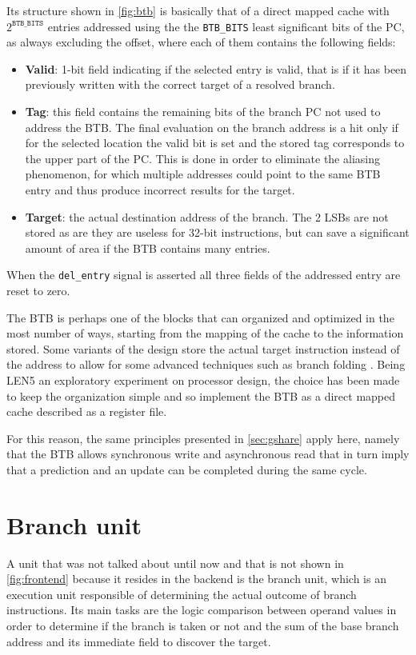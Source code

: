 Its structure shown in \cref{fig:btb} is basically that of a direct mapped cache with $2^{\texttt{BTB\_BITS}}$ entries addressed using the the \texttt{BTB\_BITS} least significant bits of the \ac{PC}, as always excluding the offset, where each of them contains the following fields:
\begin{itemize}
  \item \textbf{Valid}: 1-bit field indicating if the selected entry is valid, that is if it has been previously written with the correct target of a resolved branch.
  \item \textbf{Tag}: this field contains the remaining bits of the branch \ac{PC} not used to address the \ac{BTB}. The final evaluation on the branch address is a hit only if for the selected location the valid bit is set and the stored tag corresponds to the upper part of the \ac{PC}. This is done in order to eliminate the aliasing phenomenon, for which multiple addresses could point to the same \ac{BTB} entry and thus produce incorrect results for the target. 
  \item \textbf{Target}: the actual destination address of the branch. The 2 \acsp{LSB} are not stored as are they are useless for 32-bit instructions, but can save a significant amount of area if the \ac{BTB} contains many entries.
\end{itemize}
When the \texttt{del\_entry} signal is asserted all three fields of the addressed entry are reset to zero.

The \ac{BTB} is perhaps one of the blocks that can organized and optimized in the most number of ways, starting from the mapping of the cache to the information stored. Some variants of the design store the actual target instruction instead of the address to allow for some advanced techniques such as branch folding \cite{perleberg93}. Being LEN5 an exploratory experiment on processor design, the choice has been made to keep the organization simple and so implement the \ac{BTB} as a direct mapped cache described as a register file.

For this reason, the same principles presented in \cref{sec:gshare} apply here, namely that the \ac{BTB} allows synchronous write and asynchronous read that in turn imply that a prediction and an update can be completed during the same cycle.

\section{Branch unit}
A unit that was not talked about until now and that is not shown in \cref{fig:frontend} because it resides in the backend is the branch unit, which is an execution unit responsible of determining the actual outcome of branch instructions. Its main tasks are the logic comparison between operand values in order to determine if the branch is taken or not and the sum of the base branch address and its immediate field to discover the target.

